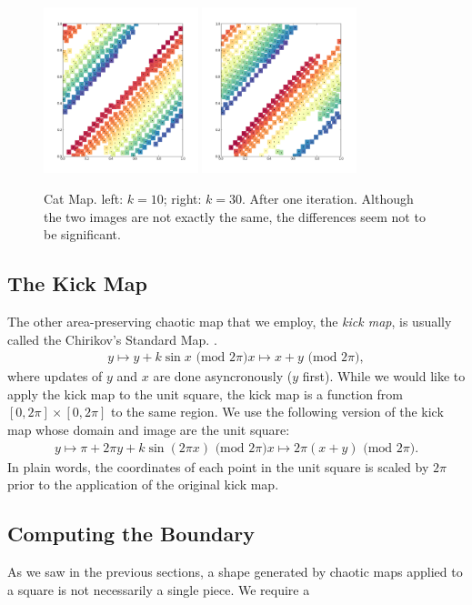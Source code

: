 \documentclass[12pt]{article}
\begin{document}
\begin{figure}[t]
  \centering
  \includegraphics[width=0.4\textwidth]{catmap_10}
  \hspace{2cm}
  \includegraphics[width=0.4\textwidth]{catmap_30}
  \caption{Cat Map. left: $k=10$; right: $k = 30$. After one iteration. 
    Although the two images are not exactly the same, the differences seem not to be significant.
  }
  \label{fig:catmap_demo2}
\end{figure}

\subsection{The Kick Map}
The other area-preserving chaotic map that we employ, the \textit{kick map}, is usually called the Chirikov's Standard Map. \citep{ott}.
\begin{align*}
  y \mapsto y + k \sin x \mbox{ (mod $2\pi$)}
  x \mapsto x + y \mbox{ (mod $2\pi$)},
\end{align*}
where updates of $y$ and $x$ are done asyncronously ($y$ first).
While we would like to apply the kick map to the unit square, the kick map is a function from $[0,2\pi] \times [0,2\pi]$ to the same region.
We use the following version of the kick map whose domain and image are the unit square:
\begin{align*}
  y \mapsto \pi + 2\pi y + k \sin (2\pi x) \mbox{ (mod $2\pi$)}
  x \mapsto 2\pi (x + y) \mbox{ (mod $2\pi$)}.
\end{align*}
In plain words, the coordinates of each point in the unit square is scaled by $2\pi$ prior to the application of the original kick map.

\subsection{Computing the Boundary}
As we saw in the previous sections, a shape generated by chaotic maps applied to a square is not necessarily a single piece.
We require a 
\end{document}
